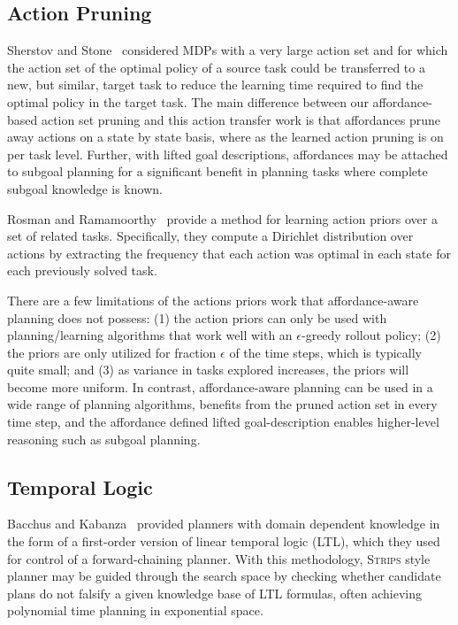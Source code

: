\documentclass[conference]{IEEEtran}
\begin{document}
\subsection{Action Pruning}

Sherstov and Stone~\cite{sherstov2005improving} considered MDPs with a very large action set and for which the action
set of the optimal policy of a source task could be transferred to a new, but similar, target
task to reduce the learning time required to find the optimal policy in the target task. The main difference between our affordance-based action set pruning and this action transfer
work is that affordances prune away actions on a state by state basis, where
as the learned action pruning is on per task level. Further, with lifted goal descriptions, affordances may be attached to subgoal planning for a significant
benefit in planning tasks where complete subgoal knowledge is known.

Rosman and Ramamoorthy~\cite{rosman2012good} provide a method for learning action priors over a set of related tasks. Specifically, they compute a Dirichlet distribution over actions by extracting the frequency that each action was optimal in each state for each previously solved task.

There are a few limitations of the actions priors work that affordance-aware planning does not possess: (1) the action priors can only be used with planning/learning algorithms that work well with an $\epsilon$-greedy rollout policy; (2) the priors are only utilized for fraction $\epsilon$ of the time steps, which is typically quite small; and (3) as variance in tasks explored increases, the priors will become more uniform. In contrast, affordance-aware planning can be used in a wide range of planning algorithms, benefits from the pruned action set in every time step, and the affordance defined lifted goal-description enables higher-level reasoning such as subgoal planning.

\subsection{Temporal Logic}

Bacchus and Kabanza~\cite{Bacchus95usingtemporal,Bacchus99usingtemporal} provided
planners with domain dependent knowledge in the form of a first-order version of linear
temporal logic (LTL), which they used for control of a forward-chaining planner. With this methodology, 
\textsc{Strips} style planner may be guided through the search space by checking 
whether candidate plans do not falsify a given knowledge base of LTL formulas, often
achieving polynomial time planning in exponential space.
\end{document}

